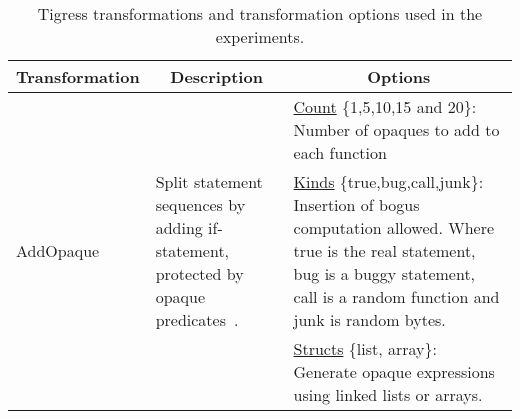

\begin{table*}[!hp]
\caption{Tigress transformations and transformation options used in the experiments.}
\label{tab:tigress}
\begin{tabular}{|p{2.25cm}|p{4cm}|p{11cm}|}
\hline
\multicolumn{1}{|c|}{Transformation} & \multicolumn{1}{c|}{Description}                                                                                                                                                                                                                                                                        & \multicolumn{1}{c|}{Options}                                                                                                                                                                                                                                                                                                                             \\ \hline
\multirow{3}{*}{AddOpaque}           & \multirow{3}{4cm}{Split statement sequences by adding if-statement, protected by opaque predicates~\cite{collberg98manufacturing}.} & \underline{Count} \{1,5,10,15 and 20\}: Number of opaques to add to each function                                                                                                                                                                                                                                                                                             \\ \cline{3-3} 
                                     &                                                                                                                                                                                                                                                                                                         & \underline{Kinds} \{true,bug,call,junk\}: Insertion of bogus computation allowed. Where true is the real statement, bug is a buggy statement, call is a random function and junk is random bytes.                                                                                                                                                                     \\ \cline{3-3} 
                                     &                                                                                                                                                                                                                                                                                                         & \underline{Structs} \{list, array\}: Generate opaque expressions using linked lists or arrays.                                                                                                                                                                                                                                                                       \\ \hline

\end{tabular}
\end{table*}
